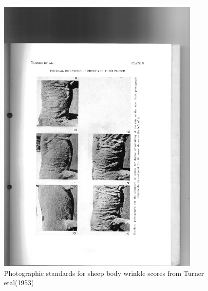 %

\begin{figure}[!h]
  \centering
   \includegraphics[width=0.9\textwidth]{wrbody.png}
  \caption{Photographic standards for sheep body wrinkle scores from Turner etal(1953)~\cite{turn:53}}
  \label{fig:wrbody}
\end{figure}

%

